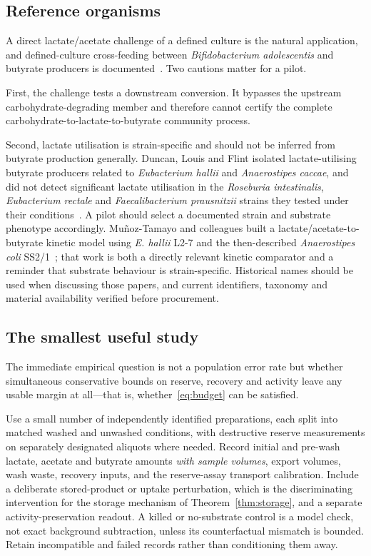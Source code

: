\documentclass[11pt]{article}
\theoremstyle{plain}
\theoremstyle{definition}
\theoremstyle{remark}
\begin{document}
\subsection{Reference organisms}

A direct lactate/acetate challenge of a defined culture is the natural
application, and defined-culture cross-feeding between
\emph{Bifidobacterium adolescentis} and butyrate producers is
documented~\cite{belenguer}. Two cautions matter for a pilot.

First, the challenge tests a downstream conversion. It bypasses the upstream
carbohydrate-degrading member and therefore cannot certify the complete
carbohydrate-to-lactate-to-butyrate community process.

Second, lactate utilisation is strain-specific and should not be inferred from
butyrate production generally. Duncan, Louis and Flint isolated
lactate-utilising butyrate producers related to \emph{Eubacterium hallii} and
\emph{Anaerostipes caccae}, and did not detect significant lactate utilisation
in the \emph{Roseburia intestinalis}, \emph{Eubacterium rectale} and
\emph{Faecalibacterium prausnitzii} strains they tested under their
conditions~\cite{duncan}. A pilot should select a documented strain and
substrate phenotype accordingly. Muñoz-Tamayo and colleagues built a
lactate/acetate-to-butyrate kinetic model using \emph{E. hallii} L2-7 and the
then-described \emph{Anaerostipes coli} SS2/1~\cite{munoz}; that work is both
a directly relevant kinetic comparator and a reminder that substrate behaviour
is strain-specific. Historical names should be used when discussing those
papers, and current identifiers, taxonomy and material availability verified
before procurement.

\subsection{The smallest useful study}

The immediate empirical question is not a population error rate but whether
simultaneous conservative bounds on reserve, recovery and activity leave any
usable margin at all---that is, whether~\eqref{eq:budget} can be satisfied.

Use a small number of independently identified preparations, each split into
matched washed and unwashed conditions, with destructive reserve measurements
on separately designated aliquots where needed. Record initial and pre-wash
lactate, acetate and butyrate amounts \emph{with sample volumes}, export
volumes, wash waste, recovery inputs, and the reserve-assay transport
calibration. Include a deliberate stored-product or uptake perturbation, which
is the discriminating intervention for the storage mechanism of
Theorem~\ref{thm:storage}, and a separate activity-preservation readout. A
killed or no-substrate control is a model check, not exact background
subtraction, unless its counterfactual mismatch is bounded. Retain
incompatible and failed records rather than conditioning them away.
\end{document}
